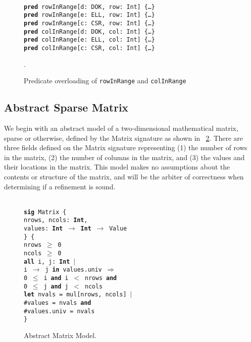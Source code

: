 \documentclass[11pt,conference]{IEEEtran}
\newenvironment{myquote}{\list{}{\leftmargin=12pt\rightmargin=0pt}\item[]}{\endlist}
\def\TA{\makebox[12pt]{}}
\def\TB{\makebox[24pt]{}}
\def\TC{\makebox[36pt]{}}
\def\Bsig{\textbf{sig} }
\def\Bpred{\textbf{pred} }
\def\Ball{\textbf{all} }
\def\Bin{\textbf{in} }
\def\Band{\textbf{and} }
\def\Bimplies{$\Rightarrow$ }
\def\Blet{\textbf{let} }
\def\Bint{\textbf{Int}}
\begin{document}
\begin{figure}
\centering
\begin{myquote}\small{\texttt{\\
\Bpred rowInRange[d: DOK, row: Int] \{\ldots\}\\
\Bpred rowInRange[e: ELL, row: Int] \{\ldots\}\\
\Bpred rowInRange[c: CSR, row: Int] \{\ldots\}\\
\Bpred colInRange[d: DOK, col: Int] \{\ldots\}\\
\Bpred colInRange[e: ELL, col: Int] \{\ldots\}\\
\Bpred colInRange[c: CSR, col: Int] \{\ldots\}\\
}}
\end{myquote}
\caption{Predicate overloading of \texttt{rowInRange} and \texttt{colInRange}}.
\label{fig:overload}
\end{figure}

\subsection{Abstract Sparse Matrix}

We begin with an abstract model of a two-dimensional mathematical matrix, sparse or otherwise, defined by the Matrix signature as shown in \figurename~\ref{model:abstract}.  There are three fields defined on the Matrix signature representing (1) the number of rows in the matrix, (2) the number of columns in the matrix, and (3) the values and their locations in the matrix.  This model makes no assumptions about the contents or structure of the matrix, and will be the arbiter of correctness when determining if a refinement is sound.

\begin{figure}
\centering
\begin{myquote}\small{\texttt{\\
\Bsig Matrix \{\\
\TA  nrows, ncols: \Bint,\\
\TA  values: \Bint~$\rightarrow$~\Bint~$\rightarrow$~Value\\
\} \{\\
\TA nrows $\geq$ 0\\
\TA ncols $\geq$ 0\\
\TA \Ball i, j: \Bint~$|$\\
\TB i $\rightarrow$ j \Bin values.univ \Bimplies\\
\TC 0 $\leq$ i \Band i $<$ nrows \Band\\
\TC 0 $\leq$ j \Band j $<$ ncols\\
\TA \Blet nvals = mul[nrows, ncols] $|$\\
\TB \#values = nvals \Band\\
\TB \#values.univ = nvals\\
\}
}}
\end{myquote}
\caption{Abstract Matrix Model.}
\label{model:abstract}
\end{figure}
\end{document}
